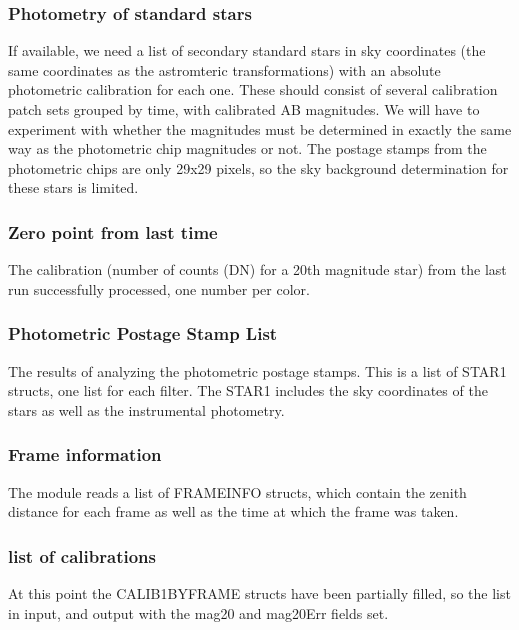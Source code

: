 \subsubsection{Photometry of standard stars}

If available, we need a list of secondary standard stars in sky
coordinates (the same coordinates as the astromteric transformations) with 
an absolute photometric calibration for each one.
These should consist of several calibration patch sets grouped by
time, with calibrated AB magnitudes. We will have to experiment with
whether the magnitudes must be determined in exactly the same way as
the photometric chip magnitudes or not.  The postage stamps from the
photometric chips are only 29x29 pixels, so the sky background
determination for these stars is limited.

\subsubsection{Zero point from last time}

The calibration (number of counts (DN) for a 20th magnitude star) from
the last run successfully processed, one number per color.

\subsubsection{Photometric Postage Stamp List}

The results of analyzing the photometric postage stamps.  This is a list
of STAR1 structs, one list for each filter.  The STAR1 includes the
sky coordinates of the stars as well as the instrumental photometry.

\subsubsection{Frame information}

The module reads a list of FRAMEINFO structs, which contain the zenith
distance for each frame as well as the time at which the frame was taken.

\subsubsection{list of calibrations}

At this point the CALIB1BYFRAME structs have been partially filled, so
the list in input, and output with the mag20 and mag20Err fields set.

